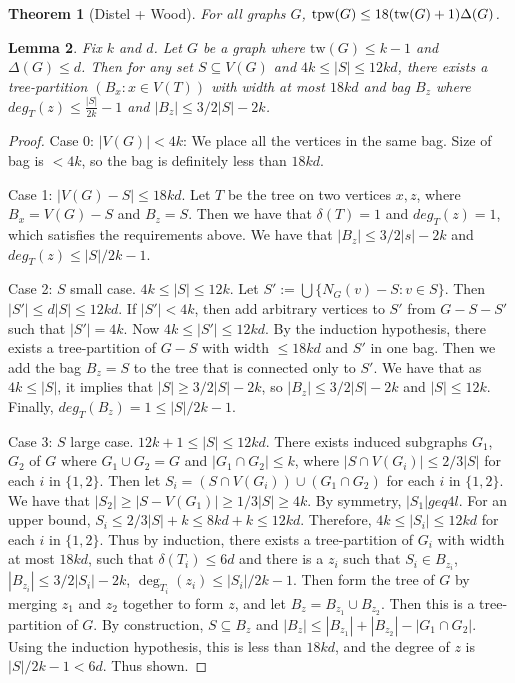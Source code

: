 \documentclass[]{article}
\newcommand{\tw}{\text{tw}}
\newtheorem{theorem}{Theorem}
\newtheorem{lemma}[theorem]{Lemma}
\theoremstyle{definition}
\numberwithin{theorem}{section}
\numberwithin{equation}{section}
\begin{document}
\begin{theorem}[Distel + Wood]
	For all graphs $G$, $\tpw(G) \leq 18 (\tw(G) + 1) \Delta(G)$. 
\end{theorem}

\begin{lemma}
	Fix $k$ and $d$. Let $G$ be a graph where $\tw(G) \leq k - 1$ and $\Delta(G) \leq d$. Then for any set $S \subseteq V(G)$ and $4k \leq |S| \leq 12kd$, there exists a tree-partition $\left( B_x : x \in V(T) \right)$ with width at most $18kd$ and bag $B_z$ where $deg_{T}(z) \leq \frac{|S|}{2k} - 1$ and $|B_z| \leq 3/2 |S| - 2k$.
\end{lemma}
\begin{proof}
	
	Case 0: $|V(G)| < 4k$: We place all the vertices in the same bag. Size of bag is $< 4k$, so the bag is definitely less than $18kd$. 
	\par
	Case 1: $|V(G) - S| \leq 18kd$. Let $T$ be the tree on two vertices ${x, z}$, where $B_x = V(G) - S$ and $B_z = S$. Then we have that $\delta(T) = 1$ and $deg_T(z) = 1$, which satisfies the requirements above. We have that $|B_z| \leq 3/2 |s| - 2k$ and $deg_T(z) \leq |S|/2k - 1$. 
	\par
	Case 2: $S$ small case. $4k \leq |S| \leq 12k$. Let $S' := \bigcup \lbrace N_G(v) - S : v \in S \rbrace$. Then $|S'| \leq d |S| \leq 12kd$. If $|S'| < 4k$, then add arbitrary vertices to $S'$ from $G - S - S'$ such that $|S'| = 4k$. Now $4k \leq |S'| \leq 12kd$. By the induction hypothesis, there exists a tree-partition of $G - S$ with width $\leq 18kd$ and $S'$ in one bag. Then we add the bag $B_z = S$ to the tree that is connected only to $S'$. We have that as $4k \leq |S|$, it implies that $|S| \geq 3/2 |S| - 2k$, so $|B_z| \leq 3/2 |S| - 2k$ and $|S| \leq 12k$. Finally, $deg_T(B_z) = 1 \leq |S|/2k - 1$.
	\par
	Case 3: $S$ large case. $12k + 1 \leq |S| \leq 12kd$. There exists induced subgraphs $G_1$, $G_2$ of $G$ where $G_1 \cup G_2 = G$ and $|G_1 \cap G_2| \leq k$, where $|S \cap V (G_i)| \leq 2/3 |S|$ for each $i$ in $\lbrace 1, 2 \rbrace$. Then let $S_i = (S \cap V(G_i)) \cup (G_1 \cap G_2)$ for each $i$ in $\lbrace 1, 2 \rbrace$. We have that $|S_2| \geq |S - V(G_1)| \geq 1/3 |S| \geq 4k$. By symmetry, $|S_1| geq 4l$. For an upper bound, $S_i \leq 2/3 |S| + k \leq 8kd + k \leq 12kd$. Therefore, $4k \leq |S_i| \leq 12kd$ for each $i$ in $\lbrace 1, 2 \rbrace$. Thus by induction, there exists a tree-partition of $G_i$ with width at most $18kd$, such that $\delta(T_i) \leq 6d$ and there is a $z_i$ such that $S_i \in B_{z_i}$, $|B_{z_i}| \leq 3/2 |S_i| - 2k$, $\deg_{T_i}(z_i) \leq |S_i|/2k - 1$. Then form the tree of $G$ by merging $z_1$ and $z_2$ together to form $z$, and let $B_z = B_{z_1} \cup B_{z_2}$. Then this is a tree-partition of $G$. By construction, $S \subseteq B_z$ and $|B_z| \leq |B_{z_1}| + |B_{z_2}| - |G_1 \cap G_2|$. Using the induction hypothesis, this is less than $18kd$, and the degree of $z$ is $|S|/2k - 1 < 6d$. Thus shown.  
\end{proof}
\end{document}
